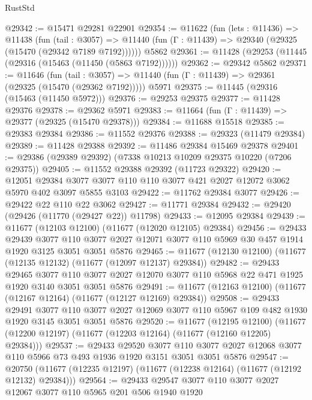 \begin{lexlean}{RustStd}
\begin{coremodule}
@29342 := @15471 @29281 @22901
@29354 := @11622
    (fun (lets : @11436) =>
    @11438
      (fun (tail : @3057) =>
      @11440 (fun (Γ : @11439) => @29340 (@29325 (@15470 (@29342 @7189 @7192))))))
    @5862
@29361 := @11428 (@29253 (@11445 (@29316 (@15463 (@11450 (@5863 @7192))))))
@29362 := @29342 @5862
@29371 := @11646
    (fun (tail : @3057) => @11440 (fun (Γ : @11439) => @29361 (@29325 (@15470 (@29362 @7192)))))
    @5971
@29375 := @11445 (@29316 (@15463 (@11450 @5972)))
@29376 := @29253 @29375
@29377 := @11428 @29376
@29378 := @29362 @5971
@29383 := @11664 (fun (Γ : @11439) => @29377 (@29325 (@15470 @29378)))
@29384 := @11688 @15518
@29385 := @29383 @29384
@29386 := @11552 @29376
@29388 := @29323 (@11479 @29384)
@29389 := @11428 @29388
@29392 := @11486 @29384 @15469 @29378
@29401 := @29386 (@29389 @29392) (@7338 @10213 @10209 @29375 @10220 (@7206 @29375))
@29405 := @11552 @29388 @29392 (@11723 @29322)
@29420 := @12051
    @29384
    @3077
    @3077
    @110
    @110
    @3077
    @421
    @2027
    @12072
    @3062
    @5970
    @402
    @3097
    @5855
    @3103
@29422 := @11762 @29384 @3077
@29426 := @29422 @22 @110 @22 @3062
@29427 := @11771 @29384
@29432 := @29420 (@29426 (@11770 (@29427 @22)) @11798)
@29433 := @12095 @29384
@29439 := @11677 (@12103 @12100) (@11677 (@12020 @12105) @29384)
@29456 := @29433
    @29439
    @3077
    @110
    @3077
    @2027
    @12071
    @3077
    @110
    @5969
    @30
    @457
    @1914
    @1920
    @3125
    @3051
    @3051
    @5876
@29465 := @11677 (@12130 @12100) (@11677 (@12135 @12132) (@11677 (@12097 @12137) @29384))
@29482 := @29433
    @29465
    @3077
    @110
    @3077
    @2027
    @12070
    @3077
    @110
    @5968
    @22
    @471
    @1925
    @1920
    @3140
    @3051
    @3051
    @5876
@29491 := @11677 (@12163 @12100) (@11677 (@12167 @12164) (@11677 (@12127 @12169) @29384))
@29508 := @29433
    @29491
    @3077
    @110
    @3077
    @2027
    @12069
    @3077
    @110
    @5967
    @109
    @482
    @1930
    @1920
    @3145
    @3051
    @3051
    @5876
@29520 := @11677
    (@12195 @12100)
    (@11677 (@12200 @12197) (@11677 (@12203 @12164) (@11677 (@12160 @12205) @29384)))
@29537 := @29433
    @29520
    @3077
    @110
    @3077
    @2027
    @12068
    @3077
    @110
    @5966
    @73
    @493
    @1936
    @1920
    @3151
    @3051
    @3051
    @5876
@29547 := @20750 (@11677 (@12235 @12197) (@11677 (@12238 @12164) (@11677 (@12192 @12132) @29384)))
@29564 := @29433
    @29547
    @3077
    @110
    @3077
    @2027
    @12067
    @3077
    @110
    @5965
    @201
    @506
    @1940
    @1920

\end{coremodule}
\end{lexlean}
